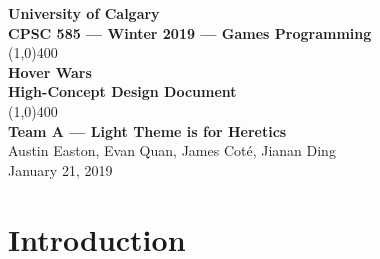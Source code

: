 \documentclass{article}
\newcommand{\namenobold}{Hover Wars}
\newcommand{\team}{Team A --- Light Theme is for Heretics}
\theoremstyle{definition}
\begin{document}
\begin{titlepage}
  \begin{center}
    \vspace*{1cm}
    \Large{\textbf{University of Calgary}}\\
    \Large{\textbf{CPSC 585 --- Winter 2019 --- Games Programming}}\\
    \vfill
    \line(1,0){400}\\[1mm]
    \huge{\textbf{\namenobold{}}}\\
    \large{\textbf{High-Concept Design Document}}\\
    \line(1,0){400}\\
    \vfill
    \Large{\textbf{\team{}}}\\
    \Large{Austin Easton, Evan Quan, James Coté, Jianan Ding}\\
    \large{January 21, 2019}
  \end{center}
\end{titlepage}
\setcounter{page}{0}
\tableofcontents
{}
\break{}

\section{Introduction}
\end{document}
